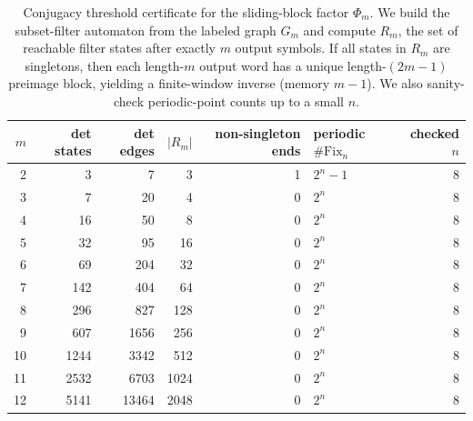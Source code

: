 \begin{table}[H]
\centering
\scriptsize
\setlength{\tabcolsep}{6pt}
\caption{Conjugacy threshold certificate for the sliding-block factor $\Phi_m$. We build the subset-filter automaton from the labeled graph $G_m$ and compute $R_m$, the set of reachable filter states after exactly $m$ output symbols. If all states in $R_m$ are singletons, then each length-$m$ output word has a unique length-$(2m-1)$ preimage block, yielding a finite-window inverse (memory $m-1$). We also sanity-check periodic-point counts up to a small $n$.}
\label{tab:phi_m_conjugacy_threshold}
\begin{tabular}{r r r r r l r}
\toprule
$m$ & det states & det edges & $|R_m|$ & non-singleton ends & periodic $\#\mathrm{Fix}_n$ & checked $n$\\
\midrule
2 & 3 & 7 & 3 & 1 & $2^n-1$ & 8\\
3 & 7 & 20 & 4 & 0 & $2^n$ & 8\\
4 & 16 & 50 & 8 & 0 & $2^n$ & 8\\
5 & 32 & 95 & 16 & 0 & $2^n$ & 8\\
6 & 69 & 204 & 32 & 0 & $2^n$ & 8\\
7 & 142 & 404 & 64 & 0 & $2^n$ & 8\\
8 & 296 & 827 & 128 & 0 & $2^n$ & 8\\
9 & 607 & 1656 & 256 & 0 & $2^n$ & 8\\
10 & 1244 & 3342 & 512 & 0 & $2^n$ & 8\\
11 & 2532 & 6703 & 1024 & 0 & $2^n$ & 8\\
12 & 5141 & 13464 & 2048 & 0 & $2^n$ & 8\\
\bottomrule
\end{tabular}
\end{table}
